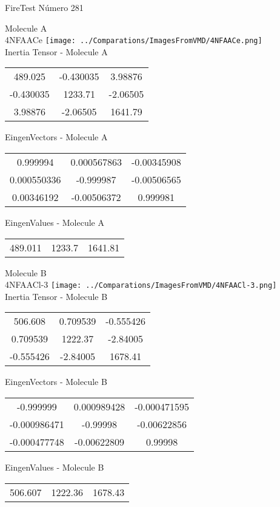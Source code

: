 \vtab[-2cm]
\begin{center}
{\large FireTest \tab Número 281}
\end{center}
\begin{multicols}{2}
\begin{center}

Molecule A \\ 
4NFAACe
\texttt{[image: ../Comparations/ImagesFromVMD/4NFAACe.png]}
\\
Inertia Tensor - Molecule A \\
\vtab

\begin{tabular}{|c c c|}
489.025	 & 	-0.430035	 & 	3.98876	 \\
-0.430035	 & 	1233.71	 & 	-2.06505	 \\
3.98876	 & 	-2.06505	 & 	1641.79
\end{tabular}

\vtab
 EingenVectors - Molecule A     \\
\vtab
\begin{tabular}{|c c c|}
0.999994	 & 	0.000567863	 & 	-0.00345908	 \\
0.000550336	 & 	-0.999987	 & 	-0.00506565	 \\
0.00346192	 & 	-0.00506372	 & 	0.999981
\end{tabular}

\vtab
 EingenValues - Molecule A     \\
\vtab
\begin{tabular}{|c c c|}
489.011	 & 	1233.7	 & 	1641.81	 \\
\end{tabular}
\columnbreak

Molecule B \\ 
4NFAACl-3
\texttt{[image: ../Comparations/ImagesFromVMD/4NFAACl-3.png]}
\\
Inertia Tensor - Molecule B \\
\vtab

\begin{tabular}{|c c c|}
506.608	 & 	0.709539	 & 	-0.555426	 \\
0.709539	 & 	1222.37	 & 	-2.84005	 \\
-0.555426	 & 	-2.84005	 & 	1678.41
\end{tabular}

\vtab
 EingenVectors - Molecule B     \\
\vtab
\begin{tabular}{|c c c|}
-0.999999	 & 	0.000989428	 & 	-0.000471595	 \\
-0.000986471	 & 	-0.99998	 & 	-0.00622856	 \\
-0.000477748	 & 	-0.00622809	 & 	0.99998
\end{tabular}

\vtab
 EingenValues - Molecule B     \\
\vtab
\begin{tabular}{|c c c|}
506.607	 & 	1222.36	 & 	1678.43	 \\
\end{tabular}

\end{center}
\end{multicols}
